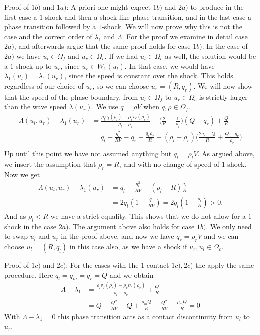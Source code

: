 \documentclass[10pt]{article}
\numberwithin{equation}{section}
\begin{document}
\begin{enumerate}
Proof of $1b)$ and $1a)$: \newline
A priori one might expect $1b)$ and $2a)$ to produce in the first case a $1$-shock and then a shock-like phase transition, and in the last case a phase transition followed by a $1$-shock. We will now prove why this is not the case and the correct order of $\lambda_1$ and $\Lambda$. 
For the proof we examine in detail case $2a)$, and afterwards argue that the same proof holds for case $1b)$. In the case of $2a)$ we have $u_l \in \Omega_f$ and $u_r \in \Omega_c$. If we had $u_l \in \Omega_c$ as well, the solution would be a $1$-shock up to $u_r$, since $u_r \in W_1(u_l)$. In that case, we would have $\lambda_1(u_l) = \lambda_1(u_r)$, since the speed is constant over the shock. This holds regardless of our choice of $u_r$, so we can choose $u_r = (R, q_r)$. We will now show that the speed of the phase boundary, from $u_l \in \Omega_f$ to $u_r \in \Omega_c$ is strictly larger than the wave speed $\lambda(u_r)$. We use $q = \rho V$ when $q, \rho \in \Omega_f$. 
\begin{align*}
    \Lambda(u_l, u_r) - \lambda_1(u_r) &= \frac{\rho_l v_f(\rho_l) - \rho_r v_c(\rho_r)}{\rho_l - \rho_r} - \bigg ( \frac{2}{R} - \frac{1}{\rho_r}\bigg) (Q-q_r) + \frac{Q}{R} \\
    &= q_l - \frac{q_l^2}{RV} - q_r + \frac{q_r \rho_r}{R} - (\rho_l - \rho_r) \bigg( \frac{2q_r - Q}{R} + \frac{Q-q_r}{\rho_r}\bigg) \\
\end{align*}
Up until this point we have not assumed anything but $q_l = \rho_l V$. As argued above, we insert the assumption that $\rho_r = R$, and with no change of speed of $1$-shock. Now we get
\begin{align*}
    \Lambda(u_l, u_r) - \lambda_1(u_r) &= q_l - \frac{q_l^2}{RV} - (\rho_l - R) \frac{q_r}{R} \\
    &= 2q_l(1- \frac{q_l}{RV}) = 2q_l(1- \frac{\rho_l}{R}) > 0.
\end{align*}
And as $\rho_l < R$ we have a strict equality. This shows that we do not allow for a $1$-shock in the case $2a)$. The argument above also holds for case $1b)$. We only need to swap $u_l$ and $u_r$ in the proof above, and now we have $q_r = \rho_r V$ and we can choose $u_l = (R, q_l)$ in this case also, as we have a shock if $u_r, u_l \in \Omega_c $. 

Proof of $1c)$ and $2c)$: \newline
For the cases with the $1$-contact $1c),2c)$ the apply the same procedure. Here $q_l = q_m = q_r = Q$ and we obtain
\begin{align*}
    \Lambda - \lambda_1 &= \frac{\rho_l v_f(\rho_l) - \rho_r v_c(\rho_r)}{\rho_l - \rho_r} + \frac{Q}{R} \\
    &= Q - \frac{Q^2}{RV} - Q + \frac{\rho_m Q}{R} + \frac{Q^2}{RV} -  \frac{\rho_m Q}{R} = 0 
\end{align*}
With $\Lambda - \lambda_1 = 0 $ this phase transition acts as a contact discontinuity from $u_l$ to $u_r$. 


\end{enumerate}
\end{document}
